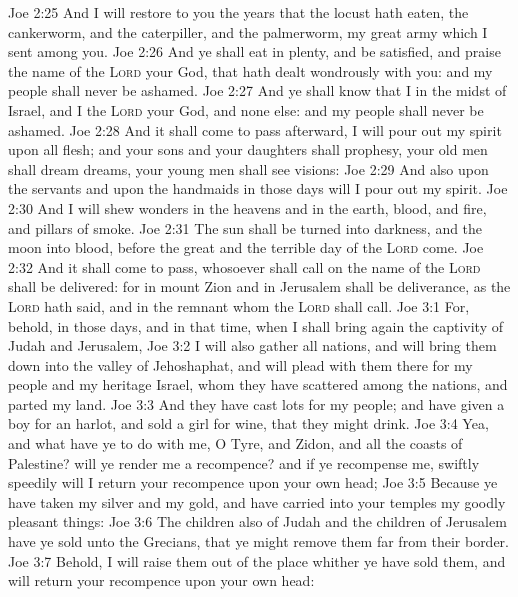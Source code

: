 \vs Joe 2:25 And I will restore to you the years that the locust hath eaten, the cankerworm, and the caterpiller, and the palmerworm, my great army which I sent among you.
\vs Joe 2:26 And ye shall eat in plenty, and be satisfied, and praise the name of the \textsc{Lord} your God, that hath dealt wondrously with you: and my people shall never be ashamed.
\vs Joe 2:27 And ye shall know that I  in the midst of Israel, and  I  the \textsc{Lord} your God, and none else: and my people shall never be ashamed.
\vs Joe 2:28 And it shall come to pass afterward,  I will pour out my spirit upon all flesh; and your sons and your daughters shall prophesy, your old men shall dream dreams, your young men shall see visions:
\vs Joe 2:29 And also upon the servants and upon the handmaids in those days will I pour out my spirit.
\vs Joe 2:30 And I will shew wonders in the heavens and in the earth, blood, and fire, and pillars of smoke.
\vs Joe 2:31 The sun shall be turned into darkness, and the moon into blood, before the great and the terrible day of the \textsc{Lord} come.
\vs Joe 2:32 And it shall come to pass,  whosoever shall call on the name of the \textsc{Lord} shall be delivered: for in mount Zion and in Jerusalem shall be deliverance, as the \textsc{Lord} hath said, and in the remnant whom the \textsc{Lord} shall call.
\vs Joe 3:1 For, behold, in those days, and in that time, when I shall bring again the captivity of Judah and Jerusalem,
\vs Joe 3:2 I will also gather all nations, and will bring them down into the valley of Jehoshaphat, and will plead with them there for my people and  my heritage Israel, whom they have scattered among the nations, and parted my land.
\vs Joe 3:3 And they have cast lots for my people; and have given a boy for an harlot, and sold a girl for wine, that they might drink.
\vs Joe 3:4 Yea, and what have ye to do with me, O Tyre, and Zidon, and all the coasts of Palestine? will ye render me a recompence? and if ye recompense me, swiftly  speedily will I return your recompence upon your own head;
\vs Joe 3:5 Because ye have taken my silver and my gold, and have carried into your temples my goodly pleasant things:
\vs Joe 3:6 The children also of Judah and the children of Jerusalem have ye sold unto the Grecians, that ye might remove them far from their border.
\vs Joe 3:7 Behold, I will raise them out of the place whither ye have sold them, and will return your recompence upon your own head:
